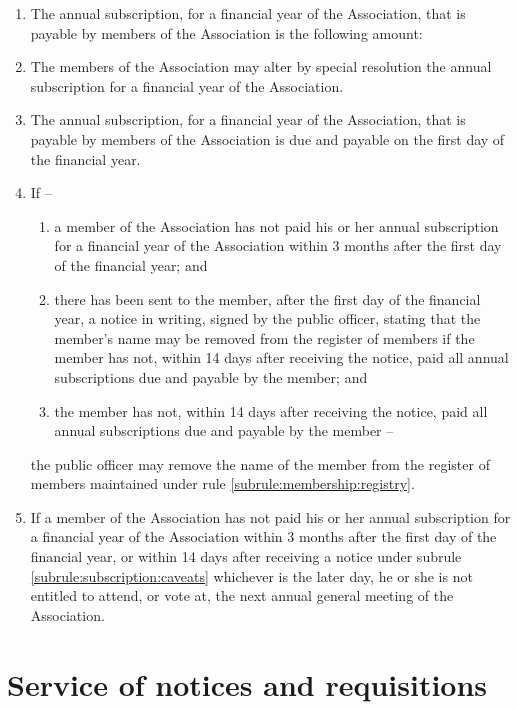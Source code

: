 \documentclass[a4paper,11pt]{article}
\begin{document}
\begin{enumerate}
	\item The annual subscription, for a financial year of the Association, that is payable by members of the Association is the following amount:\\\orgAnnualFee{}
	\item The members of the Association may alter by special resolution the annual subscription for a financial year of the Association.
	\item The annual subscription, for a financial year of the Association, that is payable by members of the Association is due and payable on the first day of the financial year.
	
	\item \label{subrule:subscription:caveats} If --
		\begin{enumerate}
			\item a member of the Association has not paid his or her annual subscription for a financial year of the Association within 3 months after the first day of the financial year; and
			\item there has been sent to the member, after the first day of the financial year, a notice in writing, signed by the public officer, stating that the member's name may be removed from the register of members if the member has not, within 14 days after receiving the notice, paid all annual subscriptions due and payable by the member; and
			\item the member has not, within 14 days after receiving the notice, paid all annual subscriptions due and payable by the member --
		\end{enumerate}	the public officer may remove the name of the member from the register of members maintained under rule \ref{subrule:membership:registry}.

	\item If a member of the Association has not paid his or her annual subscription for a financial year of the Association within 3 months after the first day of the financial year, or within 14 days after receiving a notice under subrule \ref{subrule:subscription:caveats} whichever is the later day, he or she is not entitled to attend, or vote at, the next annual general meeting of the Association.
\end{enumerate}

\section{Service of notices and requisitions}
\label{rule:notices}
\end{document}
